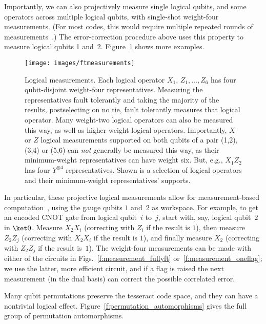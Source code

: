 \documentclass[10pt, twocolumn, aps, nofootinbib, longbibliography, nobibnotes, superscriptaddress]{revtex4-1} %
\begin{document}
Importantly, we can also projectively measure single logical qubits, and some operators across multiple logical qubits, with single-shot weight-four measurements.  (For most codes, this would require multiple repeated rounds of measurements~\cite{delfosse2020short}.)  The error-correction procedure above uses this property to measure logical qubits 1 and~2.  Figure~\ref{f:ftmeasurements} shows more examples.  

\begin{figure}
{\texttt{[image: images/ftmeasurements]}}
\caption{Logical measurements.  Each logical operator $X_1$, $Z_1, \ldots, Z_6$ has four qubit-disjoint weight-four representatives.  Measuring the representatives fault tolerantly and taking the majority of the results, postselecting on no tie, fault tolerantly measures that logical operator.  Many weight-two logical operators can also be measured this way, as well as higher-weight logical operators.  Importantly, $X$ or $Z$ logical measurements supported on both qubits of a pair (1,2), (3,4) or (5,6) can \emph{not} generally be measured this way, as their minimum-weight representatives can have weight six.  But, e.g., $X_1 Z_2$ has four $Y^{\otimes 4}$ representatives.  Shown is a selection of logical operators and their minimum-weight representatives' supports.}
\label{f:ftmeasurements}
\end{figure}

In particular, these projective logical measurements allow for measurement-based computation~\cite{RaussendorfBriegel01cluster}, using the gauge qubits $1$ and~$2$ as workspace.  For example, to get an encoded CNOT gate from logical qubit~$i$ to~$j$, start with, say, logical qubit~$2$ in $\ket 0$.  Measure $X_2 X_i$ (correcting with $Z_i$ if the result is $1$), then measure $Z_2 Z_j$ (correcting with $X_2 X_i$ if the result is $1$), and finally measure $X_2$ (correcting with $Z_2 Z_j$ if the result is~$1$).  
The weight-four measurements can be made with either of the circuits in Figs.~\ref{f:measurement_fullyft} or~\ref{f:measurement_oneflag}; we use the latter, more efficient circuit, and if a flag is raised the next measurement (in the dual basis) can correct the possible correlated error.  

\smallskip

Many qubit permutations preserve the tesseract code space, and they can have a nontrivial logical effect.  Figure~\ref{f:permutation_automorphisms} gives the full group of permutation automorphisms.  
\end{document}

